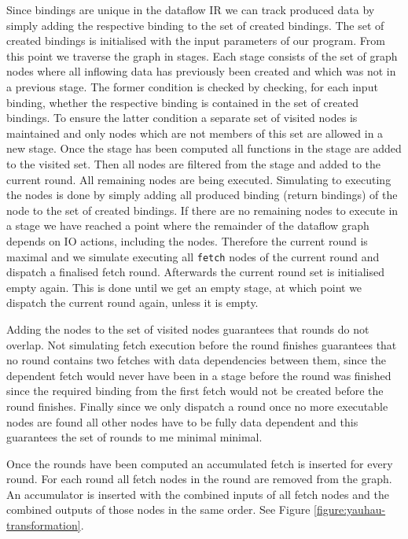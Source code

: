 Since bindings are unique in the dataflow IR we can track produced data by simply adding the respective binding to the set of created bindings.
The set of created bindings is initialised with the input parameters of our program.
From this point we traverse the graph in stages.
Each stage consists of the set of graph nodes where all inflowing data has previously been created and which was not in a previous stage.
The former condition is checked by checking, for each input binding, whether the respective binding is contained in the set of created bindings.
To ensure the latter condition a separate set of visited nodes is maintained and only nodes which are not members of this set are allowed in a new stage.
Once the stage has been computed all functions in the stage are added to the visited set.
Then all \fetch{} nodes are filtered from the stage and added to the current round.
All remaining nodes are being executed.
Simulating to executing the nodes is done by simply adding all produced binding (return bindings) of the node to the set of created bindings.
If there are no remaining nodes to execute in a stage we have reached a point where the remainder of the dataflow graph depends on IO actions, including the \fetch{} nodes.
Therefore the current round is maximal and we simulate executing all \texttt{fetch} nodes of the current round and dispatch a finalised fetch round.
Afterwards the current round set is initialised empty again.
This is done until we get an empty stage, at which point we dispatch the current round again, unless it is empty.

Adding the \fetch{} nodes to the set of visited nodes guarantees that rounds do not overlap.
Not simulating fetch execution before the round finishes guarantees that no round contains two fetches with data dependencies between them, since the dependent fetch would never have been in a stage before the round was finished since the required binding from the first fetch would not be created before the round finishes.
Finally since we only dispatch a round once no more executable nodes are found all other nodes have to be fully data dependent and this guarantees the set of rounds to me minimal minimal.

Once the rounds have been computed an accumulated fetch is inserted for every round.
For each round all fetch nodes in the round are removed from the graph.
An accumulator is inserted with the combined inputs of all fetch nodes and the combined outputs of those nodes in the same order. See Figure \ref{figure:yauhau-transformation}.

